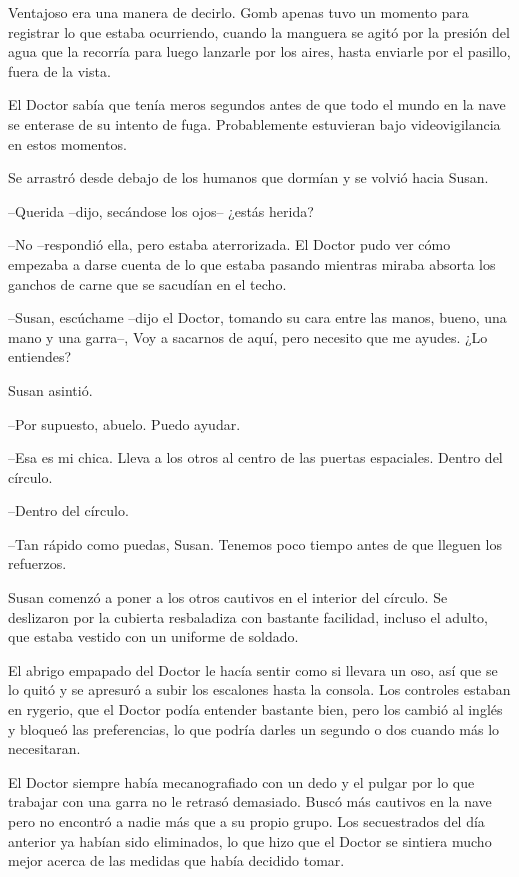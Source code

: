 Ventajoso era una manera de decirlo. Gomb apenas tuvo un momento para registrar lo que estaba ocurriendo, cuando la manguera se agitó por la presión del agua que la recorría para luego lanzarle por los aires, hasta enviarle por el pasillo, fuera de la vista.

El Doctor sabía que tenía meros segundos antes de que todo el mundo en la nave se enterase de su intento de fuga. Probablemente estuvieran bajo videovigilancia en estos momentos.

Se arrastró desde debajo de los humanos que dormían y se volvió hacia Susan.

--Querida --dijo, secándose los ojos-- ¿estás herida?

--No --respondió ella, pero estaba aterrorizada. El Doctor pudo ver cómo empezaba a darse cuenta de lo que estaba pasando mientras miraba absorta los ganchos de carne que se sacudían en el techo.

--Susan, escúchame --dijo el Doctor, tomando su cara entre las manos, bueno, una mano y una garra--, Voy a sacarnos de aquí, pero necesito que me ayudes. ¿Lo entiendes?

Susan asintió. 

--Por supuesto, abuelo. Puedo ayudar.

--Esa es mi chica. Lleva a los otros al centro de las puertas espaciales. Dentro del círculo.

--Dentro del círculo.

--Tan rápido como puedas, Susan. Tenemos poco tiempo antes de que lleguen los refuerzos.

Susan comenzó a poner a los otros cautivos en el interior del círculo. Se deslizaron por la cubierta resbaladiza con bastante facilidad, incluso el adulto, que estaba vestido con un uniforme de soldado.

El abrigo empapado del Doctor le hacía sentir como si llevara un oso, así que se lo quitó y se apresuró a subir los escalones hasta la consola. Los controles estaban en rygerio, que el Doctor podía entender bastante bien, pero los cambió al inglés y bloqueó las preferencias, lo que podría darles un segundo o dos cuando más lo necesitaran.

El Doctor siempre había mecanografiado con un dedo y el pulgar por lo que trabajar con una garra no le retrasó demasiado. Buscó más cautivos en la nave pero no encontró a nadie más que a su propio grupo. Los secuestrados del día anterior ya habían sido eliminados, lo que hizo que el Doctor se sintiera mucho mejor acerca de las medidas que había decidido tomar.

